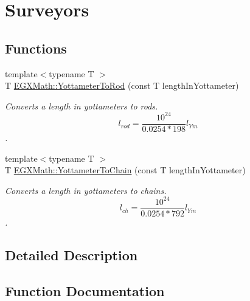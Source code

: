 \hypertarget{group___e_g_x_math-_conversions-_length_conversions-_yottameter-_surveyors}{}\section{Surveyors}
\label{group___e_g_x_math-_conversions-_length_conversions-_yottameter-_surveyors}
\subsection*{Functions}
\begin{DoxyCompactItemize}
\item 
{\footnotesize template$<$typename T $>$ }\\T \mbox{\hyperlink{group___e_g_x_math-_conversions-_length_conversions-_yottameter-_surveyors_ga877c3000c23a08dc1bcd3c4359482356}{E\+G\+X\+Math\+::\+Yottameter\+To\+Rod}} (const T length\+In\+Yottameter)
\begin{DoxyCompactList}\small\item\em Converts a length in yottameters to rods. \[ l_{rod}= \frac{10^{24}}{0.0254 * 198} l_{Ym} \]. \end{DoxyCompactList}\item 
{\footnotesize template$<$typename T $>$ }\\T \mbox{\hyperlink{group___e_g_x_math-_conversions-_length_conversions-_yottameter-_surveyors_gaac21de73406e1f0b39f48edd2bed4e4f}{E\+G\+X\+Math\+::\+Yottameter\+To\+Chain}} (const T length\+In\+Yottameter)
\begin{DoxyCompactList}\small\item\em Converts a length in yottameters to chains. \[ l_{ch}= \frac{10^{24}}{0.0254 * 792} l_{Ym} \]. \end{DoxyCompactList}\end{DoxyCompactItemize}


\subsection{Detailed Description}


\subsection{Function Documentation}
\mbox{\label{group___e_g_x_math-_conversions-_length_conversions-_yottameter-_surveyors_gaac21de73406e1f0b39f48edd2bed4e4f}} 
